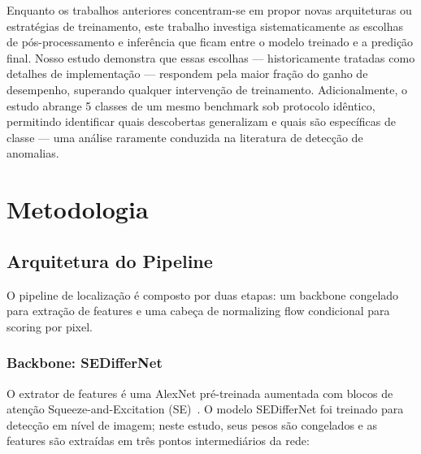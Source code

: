 \documentclass[conference]{IEEEtran}
\begin{document}
Enquanto os trabalhos anteriores concentram-se em propor novas arquiteturas ou estratégias de treinamento, este trabalho investiga sistematicamente as escolhas de pós-processamento e inferência que ficam entre o modelo treinado e a predição final. Nosso estudo demonstra que essas escolhas --- historicamente tratadas como detalhes de implementação --- respondem pela maior fração do ganho de desempenho, superando qualquer intervenção de treinamento. Adicionalmente, o estudo abrange 5 classes de um mesmo benchmark sob protocolo idêntico, permitindo identificar quais descobertas generalizam e quais são específicas de classe --- uma análise raramente conduzida na literatura de detecção de anomalias.


\section{Metodologia}
\label{sec:methods}

\subsection{Arquitetura do Pipeline}
\label{sec:arch}

O pipeline de localização é composto por duas etapas: um backbone congelado para extração de features e uma cabeça de normalizing flow condicional para scoring por pixel.

\subsubsection{Backbone: SEDifferNet}

O extrator de features é uma AlexNet pré-treinada aumentada com blocos de atenção Squeeze-and-Excitation (SE)~\cite{rudolph2021differnet}. O modelo SEDifferNet foi treinado para detecção em nível de imagem; neste estudo, seus pesos são congelados e as features são extraídas em três pontos intermediários da rede:
\end{document}
